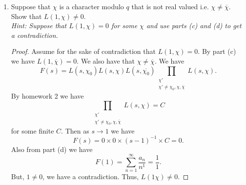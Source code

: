 \documentclass[12pt]{article}
\begin{document}
\begin{enumerate}[label=(\alph*)]
\begin{proof}
\[        \]
        For a fixed prime $p$, write $x=p^{-s}$. Now set
        \[
            E_p(x)=\prod_{\chi}(1-\chi(p)x)^{-1}.
        \]
        If $p\mid q$, then $\chi(p)=0$ giving a product of 1. If $p\nmid q$ let $d=$ord$(p)$ in $(\Z/q\Z)^\times$. Then, $\chi(p)$ is a $d-$th root of unity which appears $\frac{\phi(q)}{d}$ times. This gives
        \[
            \prod_{\chi}(1-\chi(p)x)^{-1}=\prod_{\zeta;\zeta^d=1}(1-\zeta x)^{-\frac{\phi(q)}{d}}=\left(\prod_{\zeta;\zeta^d=1}(1-\zeta x)\right)^{-\frac{\phi(q)}{d}}=(1-x^d)^{-\frac{\phi(q)}{d}}.
        \]
        We can expand as
        \[
            (1-x^d)^{-\frac{\phi(q)}{d}}=\sum_{k=0}^{\infty}\binom{k+\frac{\phi(q)}{d}-1}{k}x^{dk}.
        \]
        The binomial coefficients are all non-negative. Since $F(s)=\prod_pE_p(x)$ has a non-negative coefficient so does $F(s)=\sum a_nn^{-s}$. So $a_n\geq0$ for $n\geq2.$ Now see that 
        \[
            F(s)=\prod_{\chi}L(s,\chi)=\prod_{\chi}\sum_{n=1}^{\infty}\frac{\chi(n)}{n^{-s}}
        \]     
        $n=1$ contributes $\chi(1)=1$. So $a_1=\prod_{\chi}\chi(1)=\prod_{\chi}1=1$.
    \end{proof}
    \item Suppose that $\chi$ is a character modulo $q$ that is not real valued i.e. $\chi\neq \overline{\chi}$. Show that $L(1,\chi)\neq 0$.\\
    {\it Hint: Suppose that $L(1,\chi)=0$ for some $\chi$ and use parts (c) and (d) to get a contradiction.}
    \begin{proof}
    Assume for the sake of contradiction that $L(1,\chi)=0$. By part (c) we have $L(1,\overline{\chi})=0$. We also have that $\chi\neq\overline{\chi}$. We have
    \[
        F(s)=L(s,\chi_0)L(s,\chi)L(s,\overline{\chi_0})\prod_{\substack{\chi'\\\chi'\neq\chi_0,\chi,\overline{\chi}}}L(s,\chi).
    \]
    By homework 2 we have
    \[
        \prod_{\substack{\chi'\\\chi'\neq\chi_0,\chi,\overline{\chi}}}L(s,\chi)=C
    \]
    for some finite $C$. Then as $s\to1$ we have
    \[
        F(s)=0\times0\times(s-1)^{-1}\times C=0. 
    \]
    Also from part (d) we have
    \[
        F(1)=\sum_{n=1}^{\infty}\frac{a_n}{n^1}=\frac{1}{1}.
    \]
    But, $1\neq0$, we have a contradiction. Thus, $L(1\chi)\neq0$.
    \end{proof}
\end{enumerate}
\end{document}
